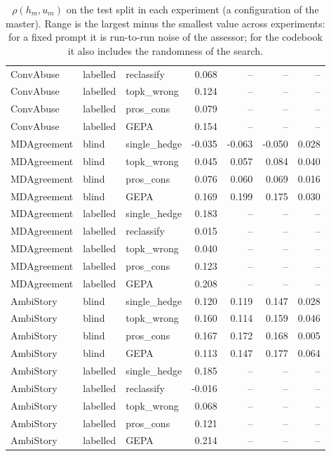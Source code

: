 \begin{table}[t]
\begin{tabular}{lllrrrr}
ConvAbuse & labelled & reclassify & 0.068 & -- & -- & -- \\
ConvAbuse & labelled & topk\_wrong & 0.124 & -- & -- & -- \\
ConvAbuse & labelled & pros\_cons & 0.079 & -- & -- & -- \\
ConvAbuse & labelled & GEPA & 0.154 & -- & -- & -- \\
MDAgreement & blind & single\_hedge & -0.035 & -0.063 & -0.050 & 0.028 \\
MDAgreement & blind & topk\_wrong & 0.045 & 0.057 & 0.084 & 0.040 \\
MDAgreement & blind & pros\_cons & 0.076 & 0.060 & 0.069 & 0.016 \\
MDAgreement & blind & GEPA & 0.169 & 0.199 & 0.175 & 0.030 \\
MDAgreement & labelled & single\_hedge & 0.183 & -- & -- & -- \\
MDAgreement & labelled & reclassify & 0.015 & -- & -- & -- \\
MDAgreement & labelled & topk\_wrong & 0.040 & -- & -- & -- \\
MDAgreement & labelled & pros\_cons & 0.123 & -- & -- & -- \\
MDAgreement & labelled & GEPA & 0.208 & -- & -- & -- \\
AmbiStory & blind & single\_hedge & 0.120 & 0.119 & 0.147 & 0.028 \\
AmbiStory & blind & topk\_wrong & 0.160 & 0.114 & 0.159 & 0.046 \\
AmbiStory & blind & pros\_cons & 0.167 & 0.172 & 0.168 & 0.005 \\
AmbiStory & blind & GEPA & 0.113 & 0.147 & 0.177 & 0.064 \\
AmbiStory & labelled & single\_hedge & 0.185 & -- & -- & -- \\
AmbiStory & labelled & reclassify & -0.016 & -- & -- & -- \\
AmbiStory & labelled & topk\_wrong & 0.068 & -- & -- & -- \\
AmbiStory & labelled & pros\_cons & 0.121 & -- & -- & -- \\
AmbiStory & labelled & GEPA & 0.214 & -- & -- & -- \\
\hline
\end{tabular}
\caption{$\rho(h_m,u_m)$ on the test split in each experiment (a configuration of the master). Range is the largest minus the smallest value across experiments: for a fixed prompt it is run-to-run noise of the assessor; for the codebook it also includes the randomness of the search.}
\label{tab:experiments}
\end{table}